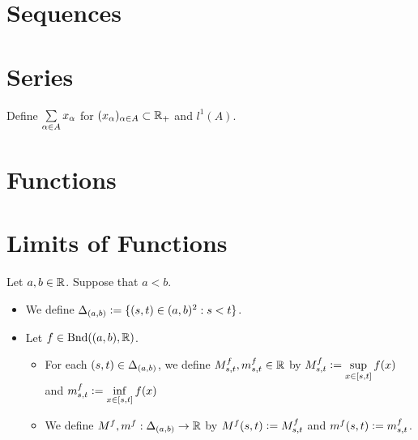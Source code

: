 \documentclass{book}
\begin{document}
	\section{Sequences}
	
	\section{Series}
	
	\begin{defn}
		Define $\sum\limits_{\alpha \in A} x_{\alpha}$ for $(x_{\alpha})_{\alpha \in A} \subset \mathbb{R}_+$ and $l^1(A)$.
	\end{defn}
	
	\begin{ex}
	\end{ex}
	
	\section{Functions}
	
	
	
	
	
	
	
	
	
	
	
	
	
	
	
	
	
	
	
	
	
	
	
	
	
	
	
	
	
	
	
	
	
	
	
	
	
	
	
	
	
	
	
	
	
	
	\section{Limits of Functions}
	
	\begin{defn}
		Let $a,b \in \mathbb{R}$. Suppose that $a < b$. 
		\begin{itemize}
			\item We define $\Delta_{(a,b)} \vcentcolon= \{(s,t) \in (a,b)^2: s < t\}$.
			\item Let $f \in \text{Bnd}((a,b), \mathbb{R})$. 
			\begin{itemize}
				\item For each $(s,t) \in \Delta_{(a,b)}$, we define $M^f_{s,t}, m^f_{s,t} \in \mathbb{R}$ by $M^f_{s,t} \vcentcolon= \sup\limits_{x \in [s,t]} f(x)$ and $m^f_{s,t} \vcentcolon= \inf\limits_{x \in [s,t]} f(x)$
				\item We define $M^f, m^f: \Delta_{(a,b)} \rightarrow \mathbb{R}$ by $M^f(s,t) \vcentcolon= M^f_{s,t}$ and $m^f(s,t) \vcentcolon= m^f_{s,t}$.
			\end{itemize}
		\end{itemize}
	\end{defn}
	
\end{document}

